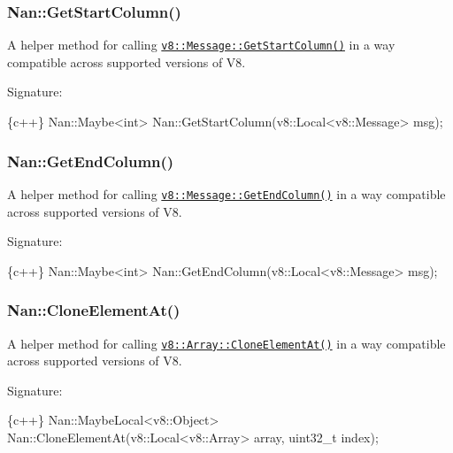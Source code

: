 \label{_api_nan_get_start_column}%
 \subsubsection*{Nan\+::\+Get\+Start\+Column()}

A helper method for calling \href{https://v8docs.nodesource.com/io.js-3.0/d9/d28/classv8_1_1_message.html#a60ede616ba3822d712e44c7a74487ba6}{\tt {\ttfamily v8\+::\+Message\+::\+Get\+Start\+Column()}} in a way compatible across supported versions of V8.

Signature\+:


\begin{DoxyCode}
\{c++\}
Nan::Maybe<int> Nan::GetStartColumn(v8::Local<v8::Message> msg);
\end{DoxyCode}


\label{_api_nan_get_end_column}%
 \subsubsection*{Nan\+::\+Get\+End\+Column()}

A helper method for calling \href{https://v8docs.nodesource.com/io.js-3.0/d9/d28/classv8_1_1_message.html#aaa004cf19e529da980bc19fcb76d93be}{\tt {\ttfamily v8\+::\+Message\+::\+Get\+End\+Column()}} in a way compatible across supported versions of V8.

Signature\+:


\begin{DoxyCode}
\{c++\}
Nan::Maybe<int> Nan::GetEndColumn(v8::Local<v8::Message> msg);
\end{DoxyCode}


\label{_api_nan_clone_element_at}%
 \subsubsection*{Nan\+::\+Clone\+Element\+At()}

A helper method for calling \href{https://v8docs.nodesource.com/io.js-3.0/d3/d32/classv8_1_1_array.html#a1d3a878d4c1c7cae974dd50a1639245e}{\tt {\ttfamily v8\+::\+Array\+::\+Clone\+Element\+At()}} in a way compatible across supported versions of V8.

Signature\+:


\begin{DoxyCode}
\{c++\}
Nan::MaybeLocal<v8::Object> Nan::CloneElementAt(v8::Local<v8::Array> array, uint32\_t index);
\end{DoxyCode}


\label{_api_nan_make_maybe}%
